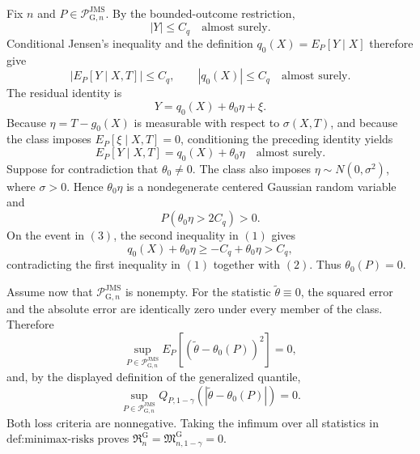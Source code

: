 Fix \(n\) and \(P\in\mathcal P_{\mathrm G,n}^{\mathrm{JMS}}\). By the bounded-outcome restriction,
\[
 |Y|\le C_q\quad\text{almost surely}.
\]
Conditional Jensen's inequality and the definition \(q_0(X)=E_P[Y\mid X]\) therefore give
\[
 \left|E_P[Y\mid X,T]\right|\le C_q,
 \qquad
 |q_0(X)|\le C_q
 \quad\text{almost surely}. \tag{1}
\]
The residual identity is
\[
 Y=q_0(X)+\theta_0\eta+\xi.
\]
Because \(\eta=T-g_0(X)\) is measurable with respect to \(\sigma(X,T)\), and because the class imposes \(E_P[\xi\mid X,T]=0\), conditioning the preceding identity yields
\[
 E_P[Y\mid X,T]=q_0(X)+\theta_0\eta
 \quad\text{almost surely}. \tag{2}
\]
Suppose for contradiction that \(\theta_0\ne0\). The class also imposes \(\eta\sim N(0,\sigma^2)\), where \(\sigma>0\). Hence \(\theta_0\eta\) is a nondegenerate centered Gaussian random variable and
\[
 P(\theta_0\eta>2C_q)>0. \tag{3}
\]
On the event in \((3)\), the second inequality in \((1)\) gives
\[
 q_0(X)+\theta_0\eta
 \ge -C_q+\theta_0\eta
 >C_q,
\]
contradicting the first inequality in \((1)\) together with \((2)\). Thus \(\theta_0(P)=0\).

Assume now that \(\mathcal P_{\mathrm G,n}^{\mathrm{JMS}}\) is nonempty. For the statistic \(\widetilde\theta\equiv0\), the squared error and the absolute error are identically zero under every member of the class. Therefore
\[
 \sup_{P\in\mathcal P_{\mathrm G,n}^{\mathrm{JMS}}}
 E_P[(\widetilde\theta-\theta_0(P))^2]=0,
\]
and, by the displayed definition of the generalized quantile,
\[
 \sup_{P\in\mathcal P_{\mathrm G,n}^{\mathrm{JMS}}}
 Q_{P,1-\gamma}(|\widetilde\theta-\theta_0(P)|)=0.
\]
Both loss criteria are nonnegative. Taking the infimum over all statistics in \(\text{def:minimax-risks}\) proves \(\mathfrak R_n^{\mathrm G}=\mathfrak M_{n,1-\gamma}^{\mathrm G}=0\).